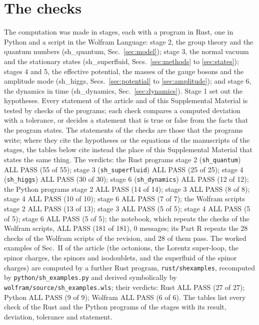 \documentclass[aps,prd,onecolumn,superscriptaddress,nofootinbib,floatfix,longbibliography]{revtex4-2}
\begin{document}
\section{The checks}
\label{sec:checks}

The computation was made in stages, each with a program in Rust, one in Python and a script in the Wolfram Language:
stage 2, the group theory and the quantum numbers (sh\_quantum, Sec.~\ref{sec:model}); stage 3, the normal vacuum and the
stationary states (sh\_superfluid, Secs.~\ref{sec:methods} to \ref{sec:states}); stages 4 and 5, the effective potential,
the masses of the gauge bosons and the amplitude mode (sh\_higgs, Secs.~\ref{sec:potential} to \ref{sec:amplitude}); and
stage 6, the dynamics in time (sh\_dynamics, Sec.~\ref{sec:dynamics}). Stage 1 set out the hypotheses.
Every statement of the article and of this Supplemental Material is tested by checks of the programs; each check
compares a computed deviation with a tolerance, or decides a statement that is true or false from the facts that the
program states. The statements of the checks are those that the programs write; where they cite the hypotheses or the
equations of the manuscripts of the stages, the tables below cite instead the place of this Supplemental Material that
states the same thing. The verdicts: the Rust programs stage 2 (\texttt{sh\_quantum}) ALL PASS (55 of 55); stage 3 (\texttt{sh\_superfluid}) ALL PASS (25 of 25); stage 4 (\texttt{sh\_higgs}) ALL PASS (30 of 30); stage 6 (\texttt{sh\_dynamics}) ALL PASS (12 of 12); the Python programs stage 2 ALL PASS (14 of 14); stage 3 ALL PASS (8 of 8); stage 4 ALL PASS (10 of 10); stage 6 ALL PASS (7 of 7); the Wolfram
scripts stage 2 ALL PASS (13 of 13); stage 3 ALL PASS (5 of 5); stage 4 ALL PASS (5 of 5); stage 6 ALL PASS (5 of 5); the notebook, which repeats the checks of the Wolfram scripts, ALL PASS (181 of 181), 0 messages; its Part R repeats the 28 checks of the Wolfram scripts of the revision, and 28 of them pass. The
worked examples of Sec.~II of the article (the octonions, the Lorentz super-loop, the spinor charges, the spinors and
isodoublets, and the superfluid of the spinor charges) are computed by a further Rust program, \texttt{rust/shexamples},
recomputed by \texttt{python/sh\_examples.py} and derived symbolically by \texttt{wolfram/source/sh\_examples.wls}; their
verdicts: Rust ALL PASS (27 of 27); Python ALL PASS (9 of 9); Wolfram ALL PASS (6 of 6). The tables list every check of the Rust and the Python programs of the stages with its
result, deviation, tolerance and statement.
\end{document}
